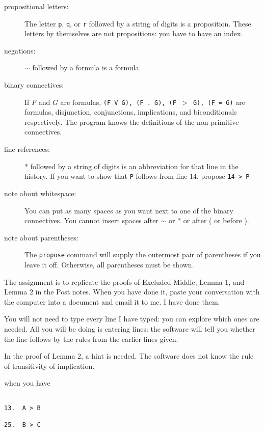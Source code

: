 \documentclass[12pt]{article}
\begin{document}
\begin{description}

\item[propositional letters:]  The letter {\tt p}, {\tt q}, or {\tt r} followed by a string of digits is a proposition.  These letters by themselves are not propositions:
you have to have an index.

\item[negations:]  $\sim$ followed by a formula is a formula.

\item[binary connectives:]  If $F$ and $G$ are formulas, {\tt (F V G), (F . G), (F $>$ G), (F = G)} are formulas, disjunction, conjunctions, implications, and biconditionals respectively.
The program knows the definitions of the non-primitive connectives.

\item[line references:]  * followed by a string of digits is an abbreviation for that line in the history.  If you want to show that {\tt P} follows from line 14, propose
{\tt *14 > P}

\item[note about whitespace:]  You can put as many spaces as you want next to one of the binary connectives.  You cannot insert spaces after $\sim$ or * or after ( or before ).

\item[note about parentheses:]  The {\tt propose} command will supply the outermost pair of parentheses if you leave it off.  Otherwise, all parentheses must be shown.

\end{description}

The assignment is to replicate the proofs of Excluded Middle, Lemma 1, and Lemma 2 in the Post notes.  When you have done it, paste your conversation with the computer into a document and email it to me.  I have done them.

You will not need to type every line I have typed:  you can explore which ones are needed.  All you will be doing is entering lines:  the software will tell you
whether the line follows by the rules from the earlier lines given.

In the proof of Lemma 2, a hint is needed.  The software does not know the rule of transitivity of implication.

when you have

\begin{verbatim}

13.  A > B

25.  B > C


\end{verbatim}
\end{document}
